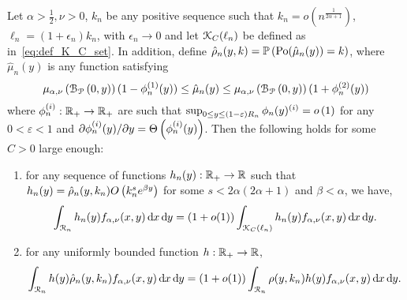 \begin{lemma}\label{lem:concentration_argument_rho_approximation}
Let $\alpha > \frac{1}{2}, \nu > 0$, $k_n$ be any positive sequence such that $k_n = o(n^{\frac{1}{2\alpha + 1}})$, $\ell_n = (1 + \epsilon_n)k_n$, with $\epsilon_n \to 0$ and let ${\mathcal K}_{C}(\ell_n)$ be defined as in~\eqref{eq:def_K_C_set}. In addition, define $\hat{\rho}_n(y,k) = \mathbb{P}\left({\mathrm{Po}}(\hat{\mu}_n(y)) = k\right)$, where $\hat{\mu}_n(y)$ is any function satisfying 
\[
	\mu_{\alpha,\nu}\left({\mathcal B}_{{\mathcal P}}\left(0,y\right)\right)(1 - \phi_n^{(1)}(y)) \le \hat{\mu}_n(y) \le \mu_{\alpha,\nu}\left({\mathcal B}_{{\mathcal P}}\left(0,y\right)\right)(1 + \phi_n^{(2)}(y))
\]
where $\phi_n^{(i)} : {\mathbb R}_+ \to {\ensuremath{\mathbb R}}_+$ are such that $\sup_{0 \le y \le (1-\varepsilon)R_n} \phi_n(y)^{(i)} = o\left(1\right)$ for any $0 < \varepsilon < 1$ and $\partial \phi_n^{(i)}(y)/\partial y = \Theta\left(\phi_n^{(i)}(y)\right)$. Then the following holds for some $C > 0$ large enough:
\begin{enumerate}
\item for any sequence of functions $h_n(y) : {\mathbb R}_+ \to {\ensuremath{\mathbb R}}$ such that $h_n(y) = \hat{\rho}_n(y,k_n) O\left(k_n^s e^{\beta y}\right)$   for some $s < 2\alpha(2\alpha + 1)$ and $\beta < \alpha$, we have,
\[
	\int_{{\mathcal R}_n} h_n(y) f_{\alpha,\nu}(x,y) \operatorname{\mathrm{d}\hspace{-2pt}} x \operatorname{\mathrm{d}\hspace{-2pt}} y 
	= (1 + o(1)) \int_{{\mathcal K}_{C}(\ell_n)} h_n(y) f_{\alpha,\nu}(x,y) \operatorname{\mathrm{d}\hspace{-2pt}} x \operatorname{\mathrm{d}\hspace{-2pt}} y.
\]
\item for any uniformly bounded function $h : {\mathbb R}_+ \to {\ensuremath{\mathbb R}}$,
\[
	\int_{{\mathcal R}_n} h(y) \hat{\rho}_n(y,k_n) f_{\alpha,\nu}(x,y) \operatorname{\mathrm{d}\hspace{-2pt}} x \operatorname{\mathrm{d}\hspace{-2pt}} y 
	= (1 + o(1)) \int_{{\mathcal R}_n} \rho(y,k_n) h(y) f_{\alpha,\nu}(x,y) \operatorname{\mathrm{d}\hspace{-2pt}} x \operatorname{\mathrm{d}\hspace{-2pt}} y.
\]
\end{enumerate}
\end{lemma}

